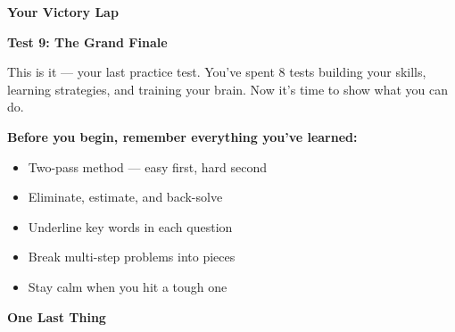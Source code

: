\clearpage
\thispagestyle{empty}
{\sffamily

\begin{center}
{\fontsize{22}{26}\selectfont\bfseries\color{funBlue} \faCrown\hspace{3mm}Your Victory Lap\hspace{3mm}\faCrown}

\vspace{2mm}
{\color{funGray}\hrulefill}
\end{center}

\vspace{3mm}

\begin{tcolorbox}[
    enhanced,
    colback=funBlueLight,
    colframe=funBlue!50,
    arc=10pt,
    boxrule=1.5pt,
    left=6mm, right=6mm, top=5mm, bottom=5mm,
]
{\large\bfseries\color{funBlueDark} \faTrophy\hspace{2mm}Test 9: The Grand Finale}

\vspace{2mm}

This is it — your last practice test. You've spent 8 tests building your skills, learning strategies, and training your brain. Now it's time to show what you can do.

\vspace{3mm}

\textbf{Before you begin, remember everything you've learned:}

\begin{itemize}[leftmargin=6mm, itemsep=3pt]
    \item[\textcolor{funBlue}{\faStar}] Two-pass method — easy first, hard second
    \item[\textcolor{funBlue}{\faStar}] Eliminate, estimate, and back-solve
    \item[\textcolor{funBlue}{\faStar}] Underline key words in each question
    \item[\textcolor{funBlue}{\faStar}] Break multi-step problems into pieces
    \item[\textcolor{funBlue}{\faStar}] Stay calm when you hit a tough one
\end{itemize}
\end{tcolorbox}

\vspace{3mm}

\begin{tcolorbox}[
    enhanced,
    colback=funYellowLight,
    colframe=funYellow!60,
    arc=10pt,
    boxrule=1pt,
    left=6mm, right=6mm, top=4mm, bottom=4mm,
]
{\bfseries\color{funYellowDark} \faLightbulb\hspace{2mm}One Last Thing}


\end{tcolorbox}}
